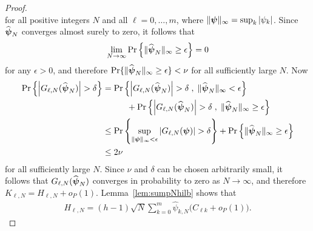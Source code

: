 \documentclass[aap,preprint]{imsart}
\newcommand{\prob}{\operatorname{Pr}}
\newcommand{\abs}[1]{\left\vert #1 \right\vert}
\begin{document}
\begin{proof}
\[\]
for all positive integers $N$ and all $\ell = 0,\dots,m$, where $\|\psibf\|_\infty = \sup_{k} \abs{\psi_k}$.  Since $\widehat{\boldsymbol{\psi}}_N$ converges almost surely to zero, it follows that 
\[
\lim_{N\rightarrow\infty}\prob\left\{ \|\widehat{\psibf}_N\|_{\infty} \geq \epsilon \right\} = 0
\]
for any $\epsilon > 0$, and therefore $\prob\{ \|\widehat{\psibf}_N\|_{\infty} \geq \epsilon \} < \nu$ for all sufficiently large $N$.  Now
\begin{align*}
  \prob\left\{\abs{ G_{\ell,N}(\widehat{\psibf}_N) } > \delta \right\} &= \prob\left\{ \abs{G_{\ell,N}(\widehat{\psibf}_N)} > \delta \;, \; \|\widehat{\psibf}_N\|_{\infty} < \epsilon \right\} \\
&\hspace{1cm} + \prob\left\{ \abs{G_{\ell,N}(\widehat{\psibf}_N)} > \delta  \;, \; \|\widehat{\psibf}_N\|_{\infty} \geq \epsilon \right\} \\
&\leq \prob\left\{  \sup_{\|\psibf\|_{\infty} < \epsilon} \abs{ G_{\ell,N}(\psibf) } > \delta \right\} + \prob\left\{ \|\widehat{\psibf}_N\|_{\infty} \geq \epsilon \right\} \\
&\leq 2\nu
\end{align*}
for all sufficiently large $N$.  Since $\nu$ and $\delta$ can be chosen arbitrarily small, it follows that $G_{\ell,N}(\widehat{\boldsymbol{\psi}}_N)$ converges in probability to zero as $N\rightarrow\infty$, and therefore $K_{\ell,N} = H_{\ell,N} + o_P(1)$.  Lemma~\ref{lem:sumpNhilb} shows that
\begin{align*}
H_{\ell,N} =  (h-1)\sqrt{N} \sum_{k=0}^{m}  \widehat{\psi}_{k,N} \big(C_{\ell k} + o_P(1)\big).
\end{align*}
\end{proof}
\end{document}
